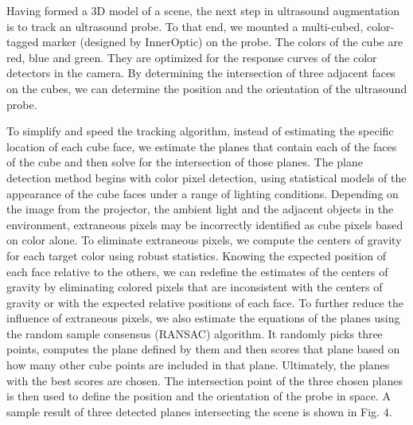 \documentclass{llncs}
\begin{document}
Having formed a 3D model of a scene, the next step in ultrasound augmentation is to track an ultrasound probe. To that end, we mounted a multi-cubed, color-tagged marker (designed by InnerOptic) on the probe.  The colors of the cube are red, blue and green. They are optimized for the response curves of the color detectors in the camera. By determining the intersection of three adjacent faces on the cubes, we can determine the position and the orientation of the ultrasound probe.

To simplify and speed the tracking algorithm, instead of estimating the specific location of each cube face, we estimate the planes that contain each of the faces of the cube and then solve for the intersection of those planes. The plane detection method begins with color pixel detection, using statistical models of the appearance of the cube faces under a range of lighting conditions. Depending on the image from the projector, the ambient light and the adjacent objects in the environment, extraneous pixels may be incorrectly identified as cube pixels based on color alone. To eliminate extraneous pixels, we compute the centers of gravity for each target color using robust statistics. Knowing the expected position of each face relative to the others, we can redefine the estimates of the centers of gravity by eliminating colored pixels that are inconsistent with the centers of gravity or with the expected relative positions of each face. To further reduce the influence of extraneous pixels, we also estimate the equations of the planes using the random sample consensus (RANSAC) algorithm. It randomly picks three points, computes the plane defined by them and then scores that plane based on how many other cube points are included in that plane. Ultimately, the planes with the best scores are chosen. The intersection point of the three chosen planes is then used to define the position and the orientation of the probe in space. A sample result of three detected planes intersecting the scene is shown in Fig. 4.
\end{document}
